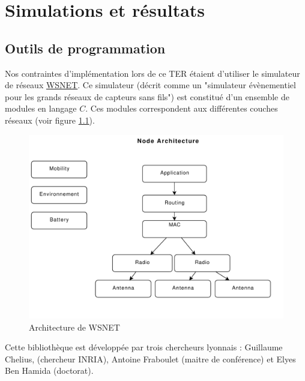\chapter{Simulations et r\'esultats}\label{simu}

\section{Outils de programmation}
Nos contraintes d'implémentation lors de ce TER étaient d'utiliser le simulateur de réseaux \href{http://wsnet.gforge.inria.fr/}{WSNET}. Ce simulateur (décrit comme un "simulateur évènementiel pour les grands réseaux de capteurs sans fils") est constitué d'un ensemble de modules en langage $C$. Ces modules correspondent aux différentes couches réseaux (voir figure \ref{structWSNET}).
\begin{figure}[h]
\centering
\includegraphics[scale=0.5]{Simus/WSNET.pdf}
\caption{Architecture de WSNET}
\label{structWSNET}
\end{figure}
Cette bibliothèque est développée par trois chercheurs lyonnais : Guillaume Chelius, (chercheur INRIA), Antoine Fraboulet (maitre de conférence) et Elyes Ben Hamida (doctorat).

